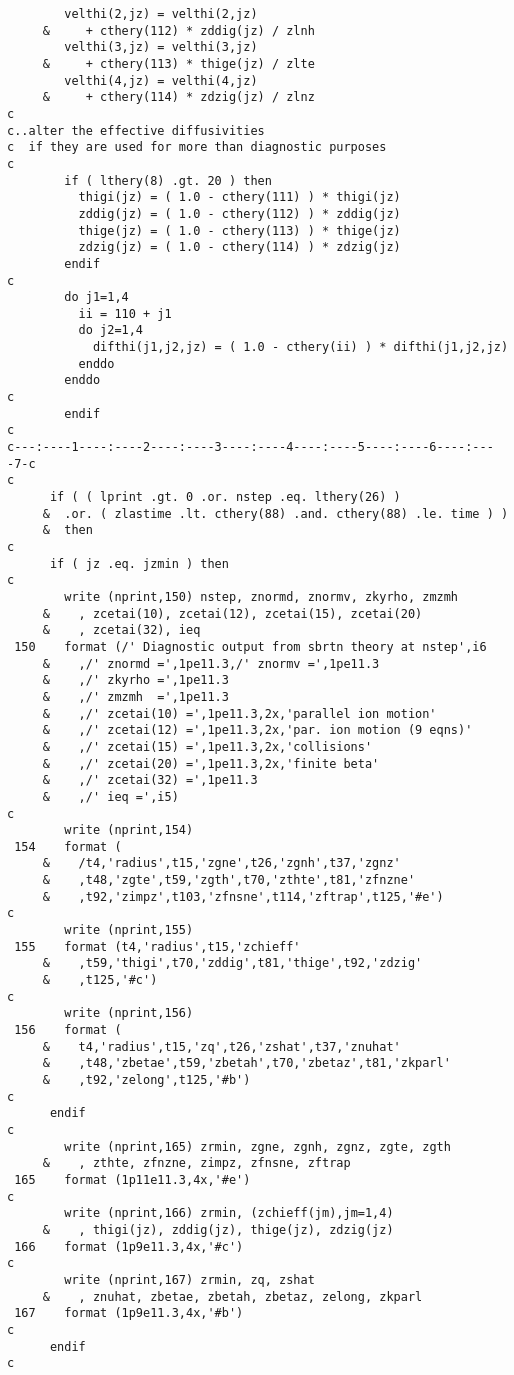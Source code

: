 \begin{verbatim}
        velthi(2,jz) = velthi(2,jz)
     &     + cthery(112) * zddig(jz) / zlnh
        velthi(3,jz) = velthi(3,jz)
     &     + cthery(113) * thige(jz) / zlte
        velthi(4,jz) = velthi(4,jz)
     &     + cthery(114) * zdzig(jz) / zlnz
c
c..alter the effective diffusivities 
c  if they are used for more than diagnostic purposes
c
        if ( lthery(8) .gt. 20 ) then
          thigi(jz) = ( 1.0 - cthery(111) ) * thigi(jz)
          zddig(jz) = ( 1.0 - cthery(112) ) * zddig(jz)
          thige(jz) = ( 1.0 - cthery(113) ) * thige(jz)
          zdzig(jz) = ( 1.0 - cthery(114) ) * zdzig(jz)
        endif
c
        do j1=1,4
          ii = 110 + j1
          do j2=1,4
            difthi(j1,j2,jz) = ( 1.0 - cthery(ii) ) * difthi(j1,j2,jz)
          enddo
        enddo
c
        endif
c
c---:----1----:----2----:----3----:----4----:----5----:----6----:----7-c
c
      if ( ( lprint .gt. 0 .or. nstep .eq. lthery(26) )
     &  .or. ( zlastime .lt. cthery(88) .and. cthery(88) .le. time ) )
     &  then
c
      if ( jz .eq. jzmin ) then
c
        write (nprint,150) nstep, znormd, znormv, zkyrho, zmzmh
     &    , zcetai(10), zcetai(12), zcetai(15), zcetai(20)
     &    , zcetai(32), ieq
 150    format (/' Diagnostic output from sbrtn theory at nstep',i6
     &    ,/' znormd =',1pe11.3,/' znormv =',1pe11.3
     &    ,/' zkyrho =',1pe11.3
     &    ,/' zmzmh  =',1pe11.3
     &    ,/' zcetai(10) =',1pe11.3,2x,'parallel ion motion'
     &    ,/' zcetai(12) =',1pe11.3,2x,'par. ion motion (9 eqns)'
     &    ,/' zcetai(15) =',1pe11.3,2x,'collisions'
     &    ,/' zcetai(20) =',1pe11.3,2x,'finite beta'
     &    ,/' zcetai(32) =',1pe11.3
     &    ,/' ieq =',i5)
c
        write (nprint,154)
 154    format (
     &    /t4,'radius',t15,'zgne',t26,'zgnh',t37,'zgnz'
     &    ,t48,'zgte',t59,'zgth',t70,'zthte',t81,'zfnzne'
     &    ,t92,'zimpz',t103,'zfnsne',t114,'zftrap',t125,'#e')
c
        write (nprint,155)
 155    format (t4,'radius',t15,'zchieff'
     &    ,t59,'thigi',t70,'zddig',t81,'thige',t92,'zdzig'
     &    ,t125,'#c')
c
        write (nprint,156)
 156    format (
     &    t4,'radius',t15,'zq',t26,'zshat',t37,'znuhat'
     &    ,t48,'zbetae',t59,'zbetah',t70,'zbetaz',t81,'zkparl'
     &    ,t92,'zelong',t125,'#b')
c
      endif
c
        write (nprint,165) zrmin, zgne, zgnh, zgnz, zgte, zgth
     &    , zthte, zfnzne, zimpz, zfnsne, zftrap
 165    format (1p11e11.3,4x,'#e')
c
        write (nprint,166) zrmin, (zchieff(jm),jm=1,4)
     &    , thigi(jz), zddig(jz), thige(jz), zdzig(jz)
 166    format (1p9e11.3,4x,'#c')
c
        write (nprint,167) zrmin, zq, zshat
     &    , znuhat, zbetae, zbetah, zbetaz, zelong, zkparl
 167    format (1p9e11.3,4x,'#b')
c
      endif
c
\end{verbatim}

